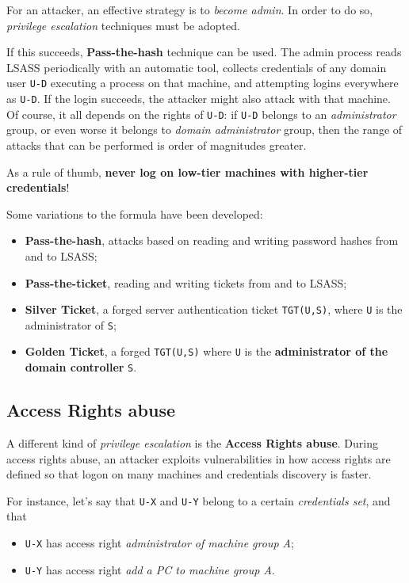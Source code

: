 \documentclass[10pt]{extbook}
\begin{document}
For an attacker, an effective strategy is to \emph{become admin}. In order to
do so, \emph{privilege escalation} techniques must be adopted.

If this succeeds, \textbf{Pass\--the\--hash} technique can be used. The admin
process reads LSASS periodically with an automatic tool, collects credentials
of any domain user \texttt{U-D} executing a process on that machine, and
attempting logins everywhere as \texttt{U-D}. If the login succeeds, the
attacker might also attack with that machine. Of course, it all depends on the
rights of \texttt{U-D}: if \texttt{U-D} belongs to an \emph{administrator}
group, or even worse it belongs to \emph{domain administrator} group, then the
range of attacks that can be performed is order of magnitudes greater.

As a rule of thumb, \textbf{never log on low\--tier machines with higher\--tier
credentials}!

Some variations to the formula have been developed:
\begin{itemize}
    \item \textbf{Pass\--the\--hash}, attacks based on reading and writing
        password hashes from and to LSASS;
    \item \textbf{Pass\--the\--ticket}, reading and writing tickets from and to
        LSASS;
    \item \textbf{Silver Ticket}, a forged server authentication ticket
        \texttt{TGT(U,S)}, where \texttt{U} is the administrator of \texttt{S};
    \item \textbf{Golden Ticket}, a forged \texttt{TGT(U,S)} where \texttt{U}
        is the \textbf{administrator of the domain controller} \texttt{S}.
\end{itemize}

\subsection{Access Rights abuse}

A different kind of \emph{privilege escalation} is the \textbf{Access Rights
abuse}. During access rights abuse, an attacker exploits vulnerabilities in how
access rights are defined so that logon on many machines and credentials
discovery is faster.


For instance, let's say that \texttt{U-X} and \texttt{U-Y} belong to a certain
\emph{credentials set}, and that
\begin{itemize}
    \item \texttt{U-X} has access right \emph{administrator of machine group
        A};
    \item \texttt{U-Y} has access right \emph{add a PC to machine group A}.
\end{itemize}
\end{document}

